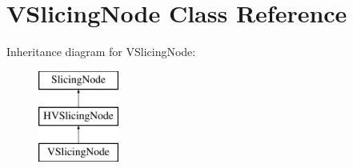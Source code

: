 \hypertarget{class_open_chams_1_1_v_slicing_node}{}\section{V\+Slicing\+Node Class Reference}
\label{class_open_chams_1_1_v_slicing_node}
Inheritance diagram for V\+Slicing\+Node\+:\begin{figure}[H]
\begin{center}
\leavevmode
\includegraphics[height=3.000000cm]{class_open_chams_1_1_v_slicing_node}
\end{center}
\end{figure}
